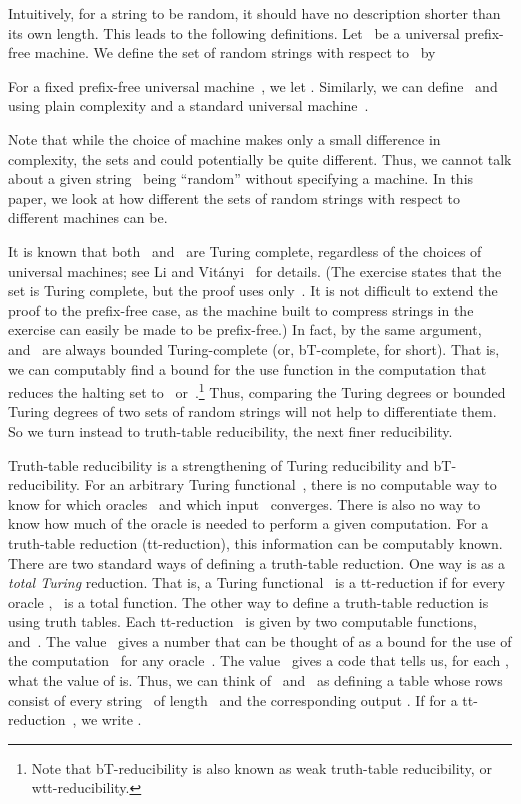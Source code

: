 \documentclass{LMCS}
\newcommand{\0}{\mathbf{0}}
\newcommand{\<}{\langle}
\renewcommand{\>}{\rangle}
\begin{document}
Intuitively, for a string to be random, it should have no description shorter
than its own length.  This leads to the following definitions.  Let~ be a
universal prefix-free machine.  We define the set of random strings with
respect to~ by

For a fixed prefix-free universal machine~, we let .
Similarly, we can define~ and~ using plain complexity and a
standard universal machine~.

Note that while the choice of machine makes only a small difference in
complexity, the sets  and  could potentially be
quite different.  Thus, we cannot talk about a given string~ being
``random'' without specifying a machine.  In this paper, we look at how
different the sets of random strings with respect to different machines can
be.

It is known that both~ and~ are Turing complete, regardless of the
choices of universal machines; see Li and
Vit\'anyi~\cite[Exer\-cise~2.7.7]{LiVitanyi} for details.  (The exercise
states that the set  is Turing
complete, but the proof uses only~.  It is not difficult to extend
the proof to the prefix-free case, as the machine built to compress strings
in the exercise can easily be made to be prefix-free.)  In fact, by the same
argument,~ and~ are always bounded Turing-complete (or,
bT-complete, for short). That is, we can computably find a bound for the use
function in the computation that reduces the halting set to~
or~.\footnote{Note that bT-reducibility is also known as weak
truth-table reducibility, or wtt-reducibility.} Thus, comparing the Turing
degrees or bounded Turing degrees of two sets of random strings will not help
to differentiate them. So we turn instead to truth-table reducibility, the
next finer reducibility.

Truth-table reducibility is a strengthening of Turing reducibility and
bT-reduci\-bi\-lity.  For an arbitrary Turing functional~, there is no
computable way to know for which oracles~ and which input~ 
converges.  There is also no way to know how much of the oracle is needed to
perform a given computation.  For a truth-table reduction (tt-reduction),
this information can be computably known.  There are two standard ways of
defining a truth-table reduction.  One way is as a {\em total Turing}
reduction.  That is, a Turing functional~ is a tt-reduction if for
every oracle ,~ is a total function.  The other way to
define a truth-table reduction is using truth tables.  Each
tt-reduction~ is given by two computable functions,~ and~.  The
value~ gives a number that can be thought of as a bound for the use of
the computation~ for any oracle~. The value~ gives a code
that tells us, for each , what the value of
 is.  Thus, we can think of~ and~ as defining a table
whose rows consist of every string~ of length~ and the
corresponding output .  If  for a
tt-reduction~, we write .
\end{document}
